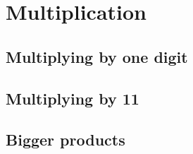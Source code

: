 \chapter{Multiplication}

\section{Multiplying by one digit}
\lesson
{}

\section{Multiplying by 11}
\lesson
{}

\section{Bigger products}
\lesson
{}
